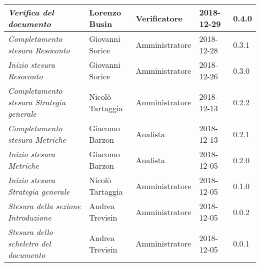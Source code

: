 \begin{longtable}{p{4cm}|C{3cm}|C{3cm}|R{2.5cm}|R{2cm}}
		\emph{Verifica del documento} & Lorenzo Busin & Verificatore & 2018-12-29 & 0.4.0 \\
		\hline
		
		\emph{Completamento stesura Resoconto} & Giovanni Sorice & Amministratore & 2018-12-28 & 0.3.1 \\
		\hline
		
		\emph{Inizio stesura Resoconto} & Giovanni Sorice & Amministratore & 2018-12-26 & 0.3.0 \\
		\hline
		
		\emph{Completamento stesura Strategia generale} & Nicolò Tartaggia & Amministratore & 2018-12-13 & 0.2.2 \\
		\hline
		
		\emph{Completamento stesura Metriche} & Giacomo Barzon & Analista & 2018-12-13 & 0.2.1 \\
		\hline
		
		\emph{Inizio stesura Metriche} & Giacomo Barzon & Analista & 2018-12-05 & 0.2.0 \\
		\hline
		
		\emph{Inizio stesura Strategia generale} & Nicolò Tartaggia & Amministratore & 2018-12-05 & 0.1.0 \\
		\hline
		
		\emph{Stesura della sezione Introduzione } & Andrea Trevisin & Amministratore & 2018-12-05 & 0.0.2 \\
		\hline
		
		\emph{Stesura dello scheletro del documento} & Andrea Trevisin & Amministratore & 2018-12-05 & 0.0.1 \\
		
	\end{longtable}


\clearpage